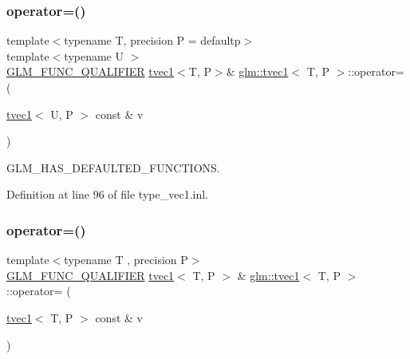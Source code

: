 \mbox{\label{structglm_1_1tvec1_afd831051f2b79ce40423c5c3c3113829}} 
\subsubsection{\texorpdfstring{operator=()}{operator=()}\hspace{0.1cm}{\footnotesize\ttfamily [1/3]}}
{\footnotesize\ttfamily template$<$typename T, precision P = defaultp$>$ \\
template$<$typename U $>$ \\
\mbox{\hyperlink{setup_8hpp_a33fdea6f91c5f834105f7415e2a64407}{G\+L\+M\+\_\+\+F\+U\+N\+C\+\_\+\+Q\+U\+A\+L\+I\+F\+I\+ER}} \mbox{\hyperlink{structglm_1_1tvec1}{tvec1}}$<$T, P$>$\& \mbox{\hyperlink{structglm_1_1tvec1}{glm\+::tvec1}}$<$ T, P $>$\+::operator= (\begin{DoxyParamCaption}\item[{\mbox{\hyperlink{structglm_1_1tvec1}{tvec1}}$<$ U, P $>$ const \&}]{v }\end{DoxyParamCaption})}



G\+L\+M\+\_\+\+H\+A\+S\+\_\+\+D\+E\+F\+A\+U\+L\+T\+E\+D\+\_\+\+F\+U\+N\+C\+T\+I\+O\+NS. 



Definition at line 96 of file type\+\_\+vec1.\+inl.

\mbox{\label{structglm_1_1tvec1_a317f46cddcdf81865c4970004e294055}} 
\subsubsection{\texorpdfstring{operator=()}{operator=()}\hspace{0.1cm}{\footnotesize\ttfamily [2/3]}}
{\footnotesize\ttfamily template$<$typename T , precision P$>$ \\
\mbox{\hyperlink{setup_8hpp_a33fdea6f91c5f834105f7415e2a64407}{G\+L\+M\+\_\+\+F\+U\+N\+C\+\_\+\+Q\+U\+A\+L\+I\+F\+I\+ER}} \mbox{\hyperlink{structglm_1_1tvec1}{tvec1}}$<$ T, P $>$ \& \mbox{\hyperlink{structglm_1_1tvec1}{glm\+::tvec1}}$<$ T, P $>$\+::operator= (\begin{DoxyParamCaption}\item[{\mbox{\hyperlink{structglm_1_1tvec1}{tvec1}}$<$ T, P $>$ const \&}]{v }\end{DoxyParamCaption})}



